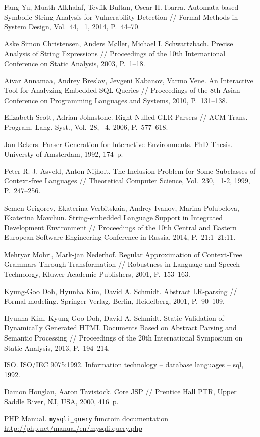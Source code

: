 \documentclass{llncs}
\begin{document}
 


%
%
\begin{thebibliography}{}
%
Fang Yu, Muath Alkhalaf, Tevfik Bultan, Oscar H. Ibarra.
Automata-based Symbolic String Analysis for Vulnerability Detection //
Formal Methods in System Design, Vol.~44, \textnumero~1, 2014, P.~44--70.

Aske Simon Christensen, Anders M{\o}ller, Michael I. Schwartzbach.
Precise Analysis of String Expressions //
Proceedings of the 10th International Conference on Static Analysis, 2003, P.~1--18.

Aivar Annamaa, Andrey Breslav, Jevgeni Kabanov, Varmo Vene.
An Interactive Tool for Analyzing Embedded SQL Queries //
Proceedings of the 8th Asian Conference on Programming Languages and Systems, 2010, P.~131--138.

Elizabeth Scott, Adrian Johnstone.
Right Nulled GLR Parsers // ACM Trans. Program. Lang. Syst., Vol.~28, \textnumero~4,
2006, P.~577--618.

Jan Rekers.
Parser Generation for Interactive Environments. PhD Thesis. Universty of Amsterdam, 1992, 174~p.

Peter R. J. Asveld, Anton Nijholt.
The Inclusion Problem for Some Subclasses of Context-free Languages //
Theoretical Computer Science, Vol.~230, \textnumero~1-2, 1999, P.~247--256.

Semen Grigorev, Ekaterina Verbitskaia, Andrey Ivanov, Marina Polubelova, Ekaterina Mavchun.
String-embedded Language Support in Integrated Development Environment //
Proceedings of the 10th Central and Eastern European Software Engineering Conference in Russia, 2014, P.~21:1--21:11.

Mehryar Mohri, Mark-jan Nederhof.
Regular Approximation of Context-Free Grammars Through Transformation //
Robustness in Language and Speech Technology, Kluwer Academic Publishers, 2001, P.~153--163. 

Kyung-Goo Doh, Hyunha Kim, David A. Schmidt.
Abstract LR-parsing //
Formal modeling. Springer-Verlag, Berlin, Heidelberg, 2001, P.~90--109.

Hyunha Kim, Kyung-Goo Doh, David A. Schmidt.
Static Validation of Dynamically Generated HTML Documents Based on Abstract Parsing and Semantic Processing //
Proceedings of the 20th International Symposium on Static Analysis, 2013, P.~194--214.

ISO. ISO/IEC 9075:1992. Information technology -- database languages -- sql, 1992.

Damon Houglan, Aaron Tavistock. Core JSP // Prentice Hall PTR, Upper Saddle River, NJ, USA, 2000, 416~p.

PHP Manual. \verb|mysqli_query| functoin documentation \url{http://php.net/manual/en/mysqli.query.php}

\end{thebibliography}
\end{document}

